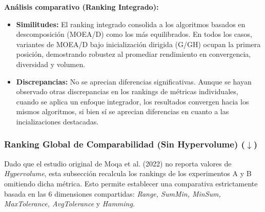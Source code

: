 \documentclass[a4paper,10pt]{article}
\begin{document}
\textbf{Análisis comparativo (Ranking Integrado):}
\begin{itemize}
    \item \textbf{Similitudes:} El ranking integrado consolida a los algoritmos basados en descomposición (MOEA/D) como los más equilibrados. En todos los casos, variantes de MOEA/D bajo inicialización dirigida (G/GH) ocupan la primera posición, demostrando robustez al promediar rendimiento en convergencia, diversidad y volumen.
    \item \textbf{Discrepancias:} No se aprecian diferencias significativas. Aunque se hayan observado otras discrepancias en los rankings de métricas individuales, cuando se aplica un enfoque integrador, los resultados convergen hacia los mismos algoritmos, si bien sí se aprecian diferencias en cuanto a las incializaciones destacadas.
\end{itemize}

\subsubsection{Ranking Global de Comparabilidad (Sin Hypervolume) \texorpdfstring{($\downarrow$)}{(down)}}

Dado que el estudio original de Moqa et al. (2022) no reporta valores de \textit{Hypervolume}, esta subsección recalcula los rankings de los experimentos A y B omitiendo dicha métrica. Esto permite establecer una comparativa estrictamente basada en las 6 dimensiones compartidas: \textit{Range, SumMin, MinSum, MaxTolerance, AvgTolerance} y \textit{Hamming}.
\end{document}
